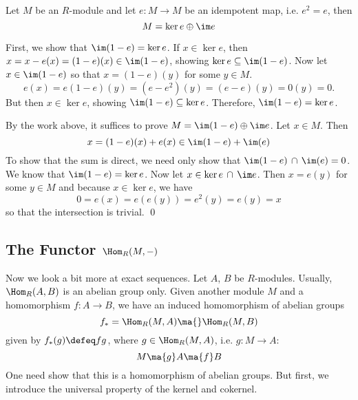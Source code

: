 \begin{lem}
Let $M$ be an $R$-module and let $e: M \rightarrow M$ be an idempotent map, i.e. $e^2=e$, then
	\[
	M=\ker e \oplus \im e
	\]
\end{lem}

\pf First, we show that $\im (1-e)=\ker e$. If $x \in \ker e$, then $x=x-e(x)=(1-e)(x) \in \im(1-e)$, showing $\ker e \subseteq \im (1-e)$. Now let $x \in \im(1-e)$ so that $x=(1-e)(y)$ for some $y \in M$. 
	\[
	e(x)=e(1-e)(y)=(e-e^2)(y)=(e-e)(y)=0(y)=0.
	\]
But then $x \in \ker e$, showing $\im(1-e) \subseteq \ker e$. Therefore, $\im(1-e)=\ker e$. 

By the work above, it suffices to prove $M=\im(1-e) \oplus \im e$. Let $x \in M$. Then
	\[
	x=(1-e)(x)+e(x) \in \im(1-e)+\im(e)
	\]
To show that the sum is direct, we need only show that $\im(1-e) \,\cap\, \im(e)=0$. We know that $\im(1-e)=\ker e$. Now let $x \in \ker e \,\cap\, \im e$. Then $x=e(y)$ for some $y \in M$ and because $x \in \ker e$, we have
	\[
	0=e(x)=e(e(y))=e^2(y)=e(y)=x
	\]
so that the intersection is trivial. \qed \\



\subsection{The Functor $\Hom_R(M,-)$}



Now we look a bit more at exact sequences. Let $A$, $B$ be $R$-modules. Usually, $\Hom_R(A,B)$ is an abelian group only. Given another module $M$ and a homomorphism $f: A \to B$, we have an induced homomorphism of abelian groups
	\[
	f_*= \Hom_R(M,A) \ma{} \Hom_R(M,B) 
	\]
given by $f_*(g)\defeq fg$, where $g \in \Hom_R(M,A)$, i.e. $g: M \to A$:
	\[
	M \ma{g} A \ma{f} B
	\]
One need show that this is a homomorphism of abelian groups. But first, we introduce the universal property of the kernel and cokernel. 


